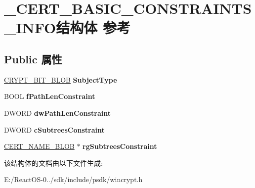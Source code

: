 \hypertarget{struct___c_e_r_t___b_a_s_i_c___c_o_n_s_t_r_a_i_n_t_s___i_n_f_o}{}\section{\+\_\+\+C\+E\+R\+T\+\_\+\+B\+A\+S\+I\+C\+\_\+\+C\+O\+N\+S\+T\+R\+A\+I\+N\+T\+S\+\_\+\+I\+N\+F\+O结构体 参考}
\label{struct___c_e_r_t___b_a_s_i_c___c_o_n_s_t_r_a_i_n_t_s___i_n_f_o}
\subsection*{Public 属性}
\begin{DoxyCompactItemize}
\item 
\mbox{\label{struct___c_e_r_t___b_a_s_i_c___c_o_n_s_t_r_a_i_n_t_s___i_n_f_o_a948d3f5a0eadb7fcacdfd4cef2f040da}} 
\hyperlink{struct___c_r_y_p_t___b_i_t___b_l_o_b}{C\+R\+Y\+P\+T\+\_\+\+B\+I\+T\+\_\+\+B\+L\+OB} {\bfseries Subject\+Type}
\item 
\mbox{\label{struct___c_e_r_t___b_a_s_i_c___c_o_n_s_t_r_a_i_n_t_s___i_n_f_o_a8f8721d16c503e5cdeb5e03c023611bc}} 
B\+O\+OL {\bfseries f\+Path\+Len\+Constraint}
\item 
\mbox{\label{struct___c_e_r_t___b_a_s_i_c___c_o_n_s_t_r_a_i_n_t_s___i_n_f_o_a98124b099e4481b16de9774dc795471c}} 
D\+W\+O\+RD {\bfseries dw\+Path\+Len\+Constraint}
\item 
\mbox{\label{struct___c_e_r_t___b_a_s_i_c___c_o_n_s_t_r_a_i_n_t_s___i_n_f_o_a721429c6ff2d0fcd6b162e0960b6803a}} 
D\+W\+O\+RD {\bfseries c\+Subtrees\+Constraint}
\item 
\mbox{\label{struct___c_e_r_t___b_a_s_i_c___c_o_n_s_t_r_a_i_n_t_s___i_n_f_o_a81f151becfb045e6f31d9bf47e28b3fa}} 
\hyperlink{struct___c_r_y_p_t_o_a_p_i___b_l_o_b}{C\+E\+R\+T\+\_\+\+N\+A\+M\+E\+\_\+\+B\+L\+OB} $\ast$ {\bfseries rg\+Subtrees\+Constraint}
\end{DoxyCompactItemize}


该结构体的文档由以下文件生成\+:\begin{DoxyCompactItemize}
\item 
E\+:/\+React\+O\+S-\/0../sdk/include/psdk/wincrypt.\+h\end{DoxyCompactItemize}
